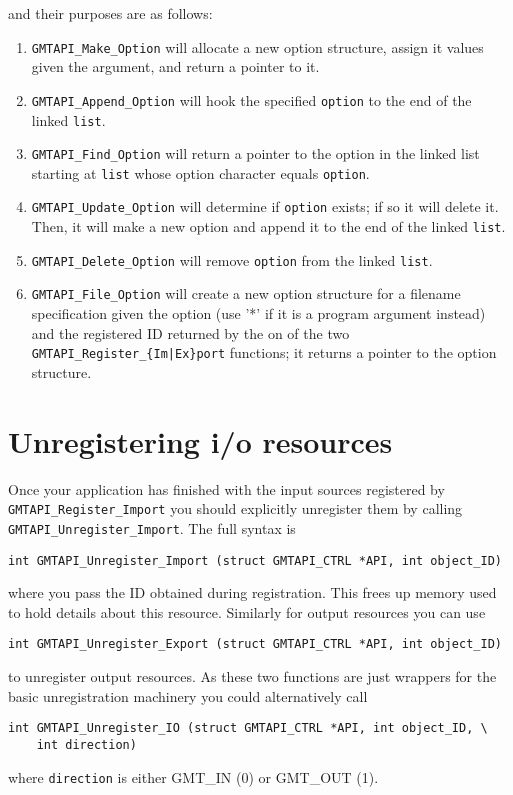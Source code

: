 \documentclass{report}
\newcommand{\GMT}{\textit{GMT}}%
\newcommand{\GMT}{\htmladdnormallink{\texttt{[image: eps/GMT\_glyph10.eps]}}{http://gmt.soest.hawaii.edu}}%
\newcommand{\GMT}{\htmladdnormallink{\textbf{GMT}}{http://gmt.soest.hawaii.edu}}%
\begin{document}
and their purposes are as follows:
\begin{enumerate}
\item \texttt{GMTAPI\_Make\_Option} will allocate a new option structure, assign it values
given the argument, and return a pointer to it.
\item \texttt{GMTAPI\_Append\_Option} will hook the specified \texttt{option} to the end
of the linked \texttt{list}.
\item \texttt{GMTAPI\_Find\_Option} will return a pointer to the option in the linked list starting
at \texttt{list} whose option character equals \texttt{option}.
\item \texttt{GMTAPI\_Update\_Option} will determine if \texttt{option} exists; if so it will delete it.
Then, it will make a new option and append it to the end of the linked \texttt{list}.
\item \texttt{GMTAPI\_Delete\_Option} will remove \texttt{option} from the linked \texttt{list}.
\item \texttt{GMTAPI\_File\_Option} will create a new option structure for a filename specification
given the option (use '*' if it is a program argument instead) and the registered ID returned by the
on of the two \texttt{GMTAPI\_Register\_\{Im|Ex\}port} functions; it
returns a pointer to the option structure.
\end{enumerate}

\section{Unregistering i/o resources}
\index{GMT@\GMT!Unregistering i/o resources}

Once your application has finished with the input sources registered by
\texttt{GMTAPI\_Register\_Import} you should explicitly unregister them by calling
\texttt{GMTAPI\_Unregister\_Import}.  The full syntax is
\begin{verbatim}
int GMTAPI_Unregister_Import (struct GMTAPI_CTRL *API, int object_ID)
\end{verbatim}
where you pass the ID obtained during registration.  This frees up memory used to hold
details about this resource.  Similarly for output resources you can use
\begin{verbatim}
int GMTAPI_Unregister_Export (struct GMTAPI_CTRL *API, int object_ID)
\end{verbatim}
to unregister output resources.  As these two functions are just wrappers for the basic
unregistration machinery you could alternatively call
\begin{verbatim}
int GMTAPI_Unregister_IO (struct GMTAPI_CTRL *API, int object_ID, \
    int direction)
\end{verbatim}
where \texttt{direction} is either GMT\_IN (0) or GMT\_OUT (1).
\end{document}
